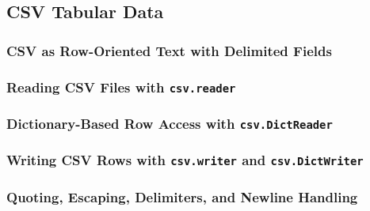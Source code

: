 \subsection{CSV Tabular Data}
\subsubsection{CSV as Row-Oriented Text with Delimited Fields}
\subsubsection{Reading CSV Files with \texttt{csv.reader}}
\subsubsection{Dictionary-Based Row Access with \texttt{csv.DictReader}}
\subsubsection{Writing CSV Rows with \texttt{csv.writer} and \texttt{csv.DictWriter}}
\subsubsection{Quoting, Escaping, Delimiters, and Newline Handling}
